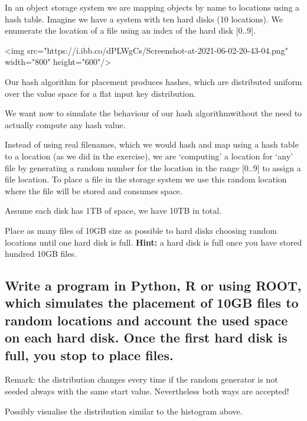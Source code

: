 \documentclass[11pt]{article}
\begin{document}
In an object storage system we are mapping objects by name to locations
using a hash table. Imagine we have a system with ten hard disks (10
locations). We enumerate the location of a file using an index of the
hard disk {[}0..9{]}.

<img src="https://i.ibb.co/dPLWgCs/Screenshot-at-2021-06-02-20-43-04.png" width="800" height="600"/>


Our hash algorithm for placement produces hashes, which are distributed
uniform over the value space for a flat input key distribution.

We want now to simulate the behaviour of our hash algorithmwithout the
need to actually compute any hash value.

Instead of using real filenames, which we would hash and map using a
hash table to a location (as we did in the exercise), we are `computing'
a location for `any' file by generating a random number for the location
in the range {[}0..9{]} to assign a file location. To place a file in
the storage system we use this random location where the file will be
stored and consumes space.

Assume each disk has 1TB of space, we have 10TB in total.

Place as many files of 10GB size as possible to hard disks choosing
random locations until one hard disk is full. \textbf{Hint:} a hard disk
is full once you have stored hundred 10GB files.

    \hypertarget{write-a-program-in-python-r-or-using-root-which-simulates-the-placement-of-10gb-files-to-random-locations-and-account-the-used-space-on-each-hard-disk.-once-the-first-hard-disk-is-full-you-stop-to-place-files.}{%
\subsection{Write a program in Python, R or using ROOT, which
simulates the placement of 10GB files to random locations and account
the used space on each hard disk. Once the first hard disk is full, you
stop to place
files.}\label{write-a-program-in-python-r-or-using-root-which-simulates-the-placement-of-10gb-files-to-random-locations-and-account-the-used-space-on-each-hard-disk.-once-the-first-hard-disk-is-full-you-stop-to-place-files.}}

Remark: the distribution changes every time if the random generator is
not seeded always with the same start value. Nevertheless both ways are
accepted!

Possibly visualise the distribution similar to the histogram above.
\end{document}
